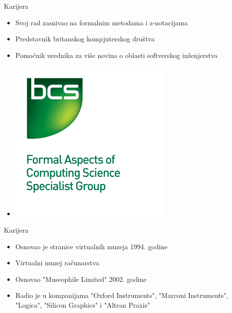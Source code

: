\documentclass{beamer}
\begin{document}
\begin{frame}{Karijera}
    \begin{itemize}
        \item Svoj rad zasnivao na formalnim metodama i z-notacijama
        \item Predstavnik britanskog kompjuterskog društva
        \item Pomoćnik urednika za više novina o oblasti softverskog inženjerstva
	    \item[] \begin{left} \includegraphics[scale=2]{BCS-FACS_logo.jpg} \end{left}
    \end{itemize}
\end{frame}

\begin{frame}{Karijera}
    \begin{itemize}
		\item Osnovao je stranice virtualnih muzeja 1994. godine
		\item Virtualni muzej računarstva 
		\item Osnovao "Museophile Limited" 2002. godine
		\item  Radio je u kompanijama "Oxford Instruments", "Marconi Instruments", "Logica", "Silicon Graphics" i "Altran Praxis"
	\end{itemize}
\end{frame}
\end{document}
